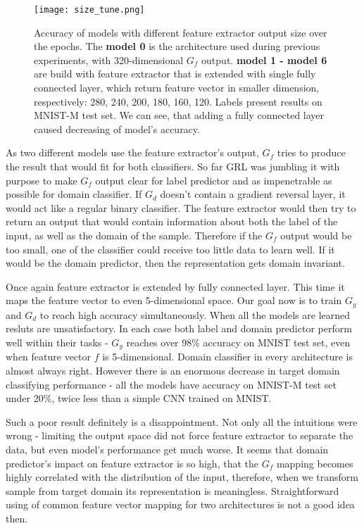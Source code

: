 \documentclass{article}
\begin{document}
\begin{figure}[htb]%
    \centering
    \texttt{[image: size\_tune.png]}%
    \caption{Accuracy of models with different feature extractor output size over the epochs. The \textbf{model 0} is the architecture used during previous experiments, with 320-dimensional $G_{f}$ output. \textbf{model 1 - model 6} are build with feature extractor that is extended with single fully connected layer, which return feature vector in smaller dimension, respectively: 280, 240, 200, 180, 160, 120. Labels present results on MNIST-M test set. We can see, that adding a fully connected layer caused decreasing of model's accuracy. }
    \label{fig:size_tune}%
\end{figure}
\par
As two different models use the feature extractor's output, $G_{f}$ tries to produce the result that would fit for both classifiers. So far GRL was jumbling it with purpose to make $G_{f}$ output clear for label predictor and as impenetrable as possible for domain classifier. If $G_{d}$ doesn't contain a gradient reversal layer, it would act like a regular binary classifier. The feature extractor would then try to return an output that would contain information about both the label of the input, as well as the domain of the sample. Therefore if the $G_{f}$ output would be too small, one of the classifier could receive too little data to learn well. If it would be the domain predictor, then the representation gets domain invariant.
\par
Once again feature extractor is extended by fully connected layer. This time it maps the feature vector to even 5-dimensional space. Our goal now is to train $G_{y}$ and $G_{d}$ to reach high accuracy simultaneously. When all the models are learned resluts are unsatisfactory. In each case both label and domain predictor perform well within their tasks - $G_{y}$ reaches over 98\% accuracy on MNIST test set, even when feature vector $f$ is 5-dimensional. Domain classifier in every architecture is almost always right. However there is an enormous decrease in target domain classifying performance - all the models have accuracy on MNIST-M test set under 20\%, twice less than a simple CNN trained on MNIST.
\par
Such a poor result definitely is a disappointment. Not only all the intuitions were wrong - limiting the output space did not force feature extractor to separate the data, but even model's performance get much worse. It seems that domain predictor's impact on feature extractor is so high, that the $G_{f}$ mapping becomes highly correlated with the distribution of the input, therefore, when we transform sample from target domain its representation is meaningless. Straightforward using of common feature vector mapping for two architectures is not a good idea then.
\end{document}
